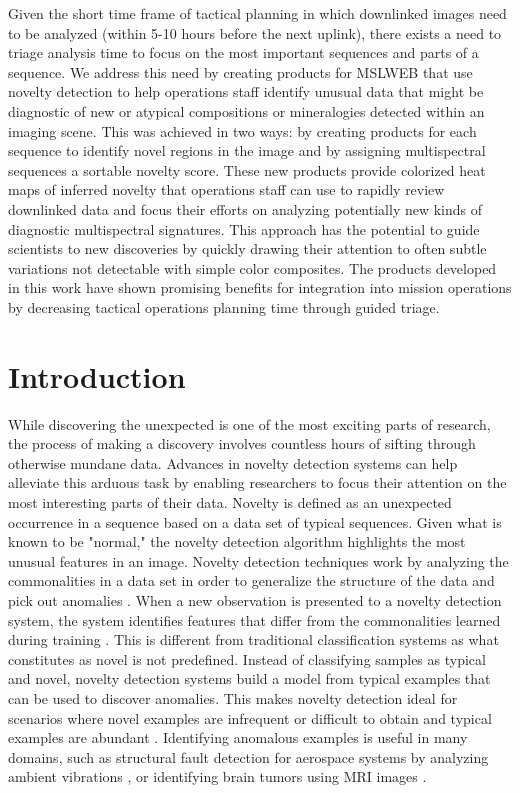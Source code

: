 Given the short time frame of tactical planning in which downlinked images need to be analyzed (within 5-10 hours before the next uplink), there exists a need to triage analysis time to focus on the most important sequences and parts of a sequence. 
We address this need by creating products for MSLWEB that use novelty detection to help operations staff identify unusual data that might be diagnostic of new or atypical compositions or mineralogies detected within an imaging scene. 
This was achieved in two ways: by creating products for each sequence to identify novel regions in the image and by assigning multispectral sequences a sortable novelty score. 
These new products provide colorized heat maps of inferred novelty that operations staff can use to rapidly review downlinked data and focus their efforts on analyzing potentially new kinds of diagnostic multispectral signatures. 
This approach has the potential to guide scientists to new discoveries by quickly drawing their attention to often subtle variations not detectable with simple color composites.
The products developed in this work have shown promising benefits for integration into mission operations by decreasing tactical operations planning time through guided triage.

\section{Introduction}
While discovering the unexpected is one of the most exciting parts of research, the process of making a discovery involves countless hours of sifting through otherwise mundane data. 
Advances in novelty detection systems can help alleviate this arduous task by enabling researchers to focus their attention on the most interesting parts of their data. 
Novelty is defined as an unexpected occurrence in a sequence based on a data set of typical sequences.
Given what is known to be "normal," the novelty detection algorithm highlights the most unusual features in an image. 
Novelty detection techniques work by analyzing the commonalities in a data set in order to generalize the structure of the data and pick out anomalies \parencite{japkowicz1995novelty}.
When a new observation is presented to a novelty detection system, the system identifies features that differ from the commonalities learned during training \parencite{markou2003novelty}.
This is different from traditional classification systems as what constitutes as novel is not predefined. 
Instead of classifying samples as typical and novel, novelty detection systems build a model from typical examples that can be used to discover anomalies. 
This makes novelty detection ideal for scenarios where novel examples are infrequent or difficult to obtain and typical examples are abundant \parencite{japkowicz1995novelty}.
Identifying anomalous examples is useful in many domains, such as structural fault detection for aerospace systems by analyzing ambient vibrations \parencite{worden1997structural}, or identifying brain tumors using MRI images \parencite{wang2020brain}.

